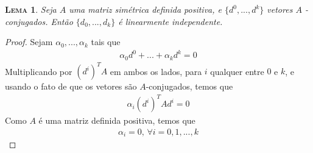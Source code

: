 \documentclass[
	12pt,				%
    oneside,			%
	a4paper,			%
	english,			%
	french,				%
	spanish,			%
	brazil,				%
	]{abntex2}
\newtheorem{lema}[theorem]{\scshape Lema}
\begin{document}
        \begin{lema}\label{lema:conjugado}
            Seja $A$ uma matriz simétrica definida positiva, e $\{d^0,...,d^{k}\}$ vetores $A$ - conjugados. Então $\{d_0,...,d_{k}\}$ é linearmente independente.
        \end{lema}
        \begin{proof}
            Sejam $\alpha_0,...,\alpha_k$ tais que
            \begin{gather*}
                \alpha_0 d^0 + ... + \alpha_k d^k = 0
            \end{gather*}
            Multiplicando por $(d^{i})^{T}A$ em ambos os lados, para $i$ qualquer entre $0$ e $k$, e usando o fato de que os vetores são $A$-conjugados, temos que
            \begin{gather*}
                \alpha_i (d^i)^T A d^i = 0
            \end{gather*}
            Como $A$ é uma matriz definida positiva, temos que
            \begin{gather}
                \alpha_i = 0\mbox{, }
                \forall i = 0,1,...,k
            \end{gather}
        \end{proof}
\end{document}

